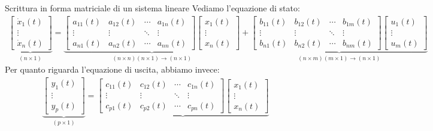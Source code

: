 \documentclass[a4paper]{report}
\begin{document}
\begin{defin}{Scrittura in forma matriciale di un sistema lineare}{}
	Vediamo l'equazione di stato:
	\begin{align}
		\underbrace{\begin{bmatrix}
			\dot x_1(t) \\
			\vdots \\
			\dot x_n(t)
		\end{bmatrix}}_{(n\times 1)} = 
		\underbrace{\begin{bmatrix}
			a_{11}(t) & a_{12}(t) & \cdots &a_{1n}(t) \\
			\vdots & \vdots & \ddots & \vdots \\
			a_{n1}(t) & a_{n2}(t) & \cdots &a_{nn}(t)
		\end{bmatrix} \begin{bmatrix}
			x_1(t) \\ \vdots \\ x_n(t)
		\end{bmatrix}}_{(n \times n)(n\times 1) \rightarrow (n\times 1)} + \underbrace{\begin{bmatrix}
			b_{11}(t) & b_{12}(t) & \cdots &b_{1m}(t) \\
			\vdots & \vdots & \ddots & \vdots \\
			b_{n1}(t) & b_{n2}(t) & \cdots &b_{nm}(t)
		\end{bmatrix} \begin{bmatrix}
			u_1(t) \\ \vdots \\ u_m(t)
		\end{bmatrix}}_{(n \times m)(m\times 1) \rightarrow (n\times 1)}
	\end{align}
	Per quanto riguarda l'equazione di uscita, abbiamo invece:
		\begin{align}
		\underbrace{
			\begin{bmatrix}
			y_1(t) \\ \vdots \\ y_p(t)
			\end{bmatrix}}_{(p\times 1)} = 
		\underbrace{\begin{bmatrix}
			c_{11}(t) & c_{12}(t) & \cdots &c_{1n}(t) \\
			\vdots & \vdots & \ddots & \vdots \\
			c_{p1}(t) & c_{p2}(t) & \cdots &c_{pn}(t)
		\end{bmatrix} \begin{bmatrix}
			x_1(t) \\ \vdots \\ x_n(t)

\end{bmatrix}}
\end{align}
\end{defin}
\end{document}
